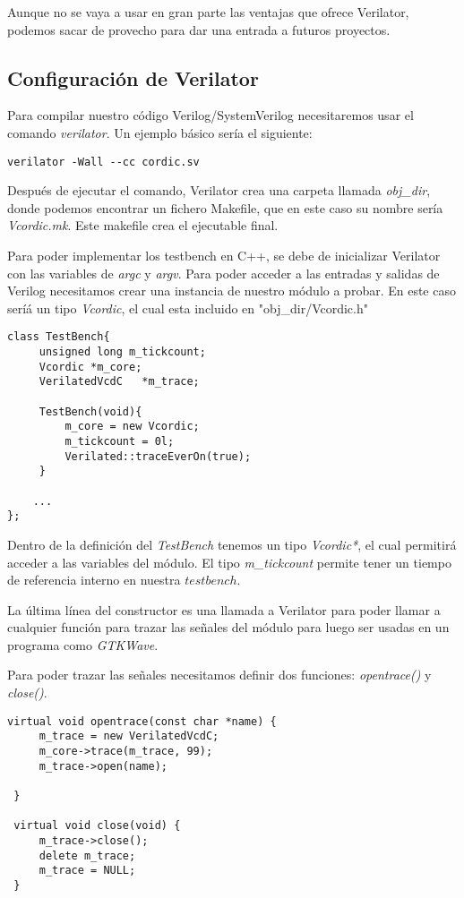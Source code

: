 Aunque no se vaya a usar en gran parte las ventajas que ofrece Verilator, podemos sacar de provecho para dar una entrada a futuros proyectos.

\subsection{Configuración de Verilator}
Para compilar nuestro código Verilog/SystemVerilog necesitaremos usar el comando \textit{verilator}. Un ejemplo básico sería el siguiente:

\begin{lstlisting}
verilator -Wall --cc cordic.sv
\end{lstlisting}

Después de ejecutar el comando, Verilator crea una carpeta llamada \textit{obj\_dir}, donde podemos encontrar un fichero Makefile, que en este caso su nombre sería \textit{Vcordic.mk}. Este makefile crea el ejecutable final.

Para poder implementar los testbench en C++, se debe de inicializar Verilator con las variables de \textit{argc} y \textit{argv}. Para poder acceder a las entradas y salidas de Verilog necesitamos crear una instancia de nuestro módulo a probar. En este caso seríá un tipo \textit{Vcordic}, el cual esta incluido en "obj\_dir/Vcordic.h"

\begin{lstlisting}[caption={Definición de una TestBench de Verilator}] 
class TestBench{
     unsigned long m_tickcount;
     Vcordic *m_core;
     VerilatedVcdC   *m_trace;
     
     TestBench(void){
         m_core = new Vcordic;
         m_tickcount = 0l;
         Verilated::traceEverOn(true);
     }
     
	...
};
\end{lstlisting}

Dentro de la definición del \textit{TestBench} tenemos un tipo \textit{Vcordic*}, el cual permitirá acceder a las variables del módulo. El tipo \textit{m\_tickcount} permite tener un tiempo de referencia interno en nuestra $testbench$.

La última línea del constructor es una llamada a Verilator para poder llamar a cualquier función para trazar las señales del módulo para luego ser usadas en un programa como \textit{GTKWave}.

Para poder trazar las señales necesitamos definir dos funciones: \textit{opentrace()} y \textit{close()}.

\begin{lstlisting}[caption={Definición de funciones para trazar la simulación.}]
 virtual void opentrace(const char *name) {
     m_trace = new VerilatedVcdC;
     m_core->trace(m_trace, 99);
     m_trace->open(name);

 }

 virtual void close(void) {
     m_trace->close();
     delete m_trace;
     m_trace = NULL;
 }
\end{lstlisting}

